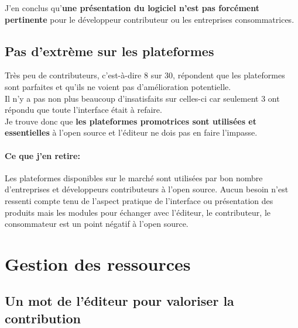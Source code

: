 			\begin{center}
				\textit{
				}
			\end{center}

			J'en conclus qu'\textbf{une présentation du logiciel n'est pas forcément pertinente} pour le développeur contributeur ou les entreprises consommatrices.

		\subsection{Pas d'extrème sur les plateformes}

			Très peu de contributeurs, c'est-à-dire 8 sur 30, répondent que les plateformes sont parfaites et qu'ils ne voient pas d'amélioration potentielle.\\

			Il n'y a pas non plus beaucoup d'insatisfaits sur celles-ci car seulement 3 ont répondu que toute l'interface était à refaire.\\

			Je trouve donc que \textbf{les plateformes promotrices sont utilisées et essentielles} à l'open source et l'éditeur ne dois pas en faire l'impasse.

		\paragraph{Ce que j'en retire:\\}

		Les plateformes disponibles sur le marché sont utilisées par bon nombre d'entreprises et développeurs contributeurs à l'open source. Aucun besoin n'est ressenti compte tenu de l'aspect pratique de l'interface ou présentation des produits mais les modules pour échanger avec l'éditeur, le contributeur, le consommateur est un point négatif à l'open source.

	\section{Gestion des ressources}

		\subsection{Un mot de l'éditeur pour valoriser la contribution}

